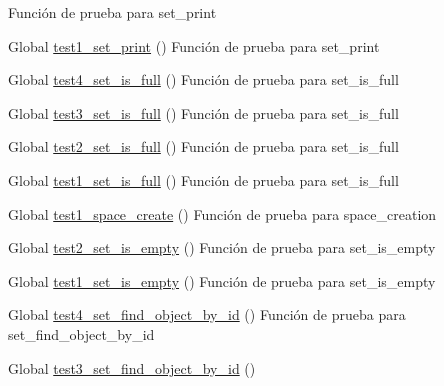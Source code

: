 \begin{DoxyRefList}
%
Función de prueba para set\+\_\+print  
\item[Global \mbox{\hyperlink{set__test_8c_a3c854f4944f73793ff85c2490401b6e8}{test1\+\_\+set\+\_\+print}} ()]\label{test__test000239}%
%
Función de prueba para set\+\_\+print  
\item[Global \mbox{\hyperlink{set__test_8c_a7c9b7ee9e08542c3d69a85d7620f632f}{test4\+\_\+set\+\_\+is\+\_\+full}} ()]\label{test__test000238}%
%
Función de prueba para set\+\_\+is\+\_\+full  
\item[Global \mbox{\hyperlink{set__test_8c_ac9078be0a2f086b649cb04e72065e6e3}{test3\+\_\+set\+\_\+is\+\_\+full}} ()]\label{test__test000237}%
%
Función de prueba para set\+\_\+is\+\_\+full  
\item[Global \mbox{\hyperlink{set__test_8c_ab1de430f3e313725897f9b0b1aba543b}{test2\+\_\+set\+\_\+is\+\_\+full}} ()]\label{test__test000236}%
%
Función de prueba para set\+\_\+is\+\_\+full  
\item[Global \mbox{\hyperlink{set__test_8c_a7bae6941906dd98c8d8ffb2da8a409f6}{test1\+\_\+set\+\_\+is\+\_\+full}} ()]\label{test__test000235}%
%
Función de prueba para set\+\_\+is\+\_\+full  
\item[Global \mbox{\hyperlink{space__test_8c_a69278cc022dc5688d4725f8d36317b30}{test1\+\_\+space\+\_\+create}} ()]\label{test__test000244}%
%
Función de prueba para space\+\_\+creation  
\item[Global \mbox{\hyperlink{set__test_8c_a13000e62535d3341e070963f4f3907ec}{test2\+\_\+set\+\_\+is\+\_\+empty}} ()]\label{test__test000233}%
%
Función de prueba para set\+\_\+is\+\_\+empty  
\item[Global \mbox{\hyperlink{set__test_8c_a0d1505a528700bc71c89a71c88d6b21e}{test1\+\_\+set\+\_\+is\+\_\+empty}} ()]\label{test__test000232}%
%
Función de prueba para set\+\_\+is\+\_\+empty  
\item[Global \mbox{\hyperlink{set__test_8c_aa8ba0e1129a84844e4621d3ca86008ce}{test4\+\_\+set\+\_\+find\+\_\+object\+\_\+by\+\_\+id}} ()]\label{test__test000231}%
%
Función de prueba para set\+\_\+find\+\_\+object\+\_\+by\+\_\+id  
\item[Global \mbox{\hyperlink{set__test_8c_adc3b0aec50481d5662dbfbcdf8f114c2}{test3\+\_\+set\+\_\+find\+\_\+object\+\_\+by\+\_\+id}} ()]\label{test__test000230}%

\end{DoxyRefList}
